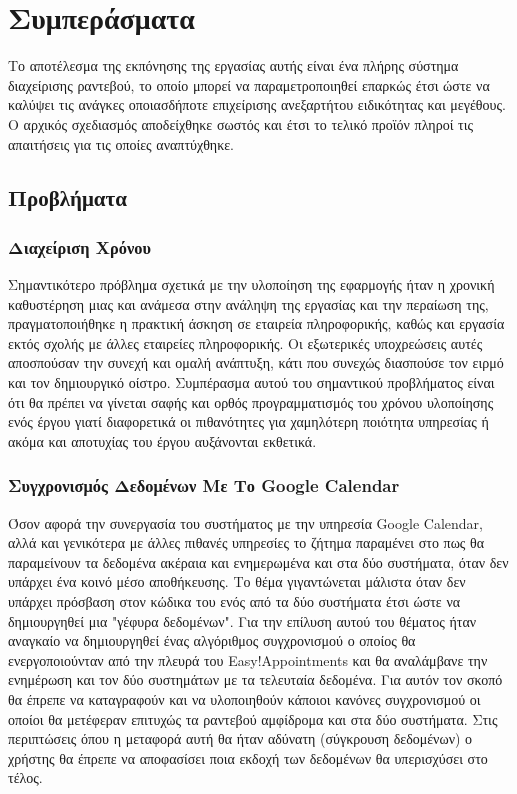 \chapter{Συμπεράσματα}
Το αποτέλεσμα της εκπόνησης της εργασίας αυτής είναι ένα πλήρης σύστημα διαχείρισης ραντεβού, το οποίο μπορεί να παραμετροποιηθεί επαρκώς έτσι ώστε να καλύψει τις ανάγκες οποιασδήποτε επιχείρισης ανεξαρτήτου ειδικότητας και μεγέθους. Ο αρχικός σχεδιασμός αποδείχθηκε σωστός και έτσι το τελικό προϊόν πληροί τις απαιτήσεις για τις οποίες αναπτύχθηκε. 

\section{Προβλήματα}
\subsection{Διαχείριση Χρόνου}
Σημαντικότερο πρόβλημα σχετικά με την υλοποίηση της εφαρμογής ήταν η χρονική καθυστέρηση μιας και ανάμεσα στην ανάληψη της εργασίας και την περαίωση της, πραγματοποιήθηκε η πρακτική άσκηση σε εταιρεία πληροφορικής, καθώς και εργασία εκτός σχολής με άλλες εταιρείες πληροφορικής. Οι εξωτερικές υποχρεώσεις αυτές αποσπούσαν την συνεχή και ομαλή ανάπτυξη, κάτι που συνεχώς διασπούσε τον ειρμό και τον δημιουργικό οίστρο. Συμπέρασμα αυτού του σημαντικού προβλήματος είναι ότι θα πρέπει να γίνεται σαφής και ορθός προγραμματισμός του χρόνου υλοποίησης ενός έργου γιατί διαφορετικά οι πιθανότητες για χαμηλότερη ποιότητα υπηρεσίας ή ακόμα και αποτυχίας του έργου αυξάνονται εκθετικά.

\subsection{Συγχρονισμός Δεδομένων Με Το Google Calendar}
Όσον αφορά την συνεργασία του συστήματος με την υπηρεσία Google Calendar, αλλά και γενικότερα με άλλες πιθανές υπηρεσίες το ζήτημα παραμένει στο πως θα παραμείνουν τα δεδομένα ακέραια και ενημερωμένα και στα δύο συστήματα, όταν δεν υπάρχει ένα κοινό μέσο αποθήκευσης. Το θέμα γιγαντώνεται μάλιστα όταν δεν υπάρχει πρόσβαση στον κώδικα του ενός από τα δύο συστήματα έτσι ώστε να δημιουργηθεί μια "γέφυρα δεδομένων". Για την επίλυση αυτού του θέματος ήταν αναγκαίο να δημιουργηθεί ένας αλγόριθμος συγχρονισμού ο οποίος θα ενεργοποιούνταν από την πλευρά του Easy!Appointments και θα αναλάμβανε την ενημέρωση και τον δύο συστημάτων με τα τελευταία δεδομένα. Για αυτόν τον σκοπό θα έπρεπε να καταγραφούν και να υλοποιηθούν κάποιοι κανόνες συγχρονισμού οι οποίοι θα μετέφεραν επιτυχώς τα ραντεβού αμφίδρομα και στα δύο συστήματα. Στις περιπτώσεις όπου η μεταφορά αυτή θα ήταν αδύνατη (σύγκρουση δεδομένων) ο χρήστης θα έπρεπε να αποφασίσει ποια εκδοχή των δεδομένων θα υπερισχύσει στο τέλος.

